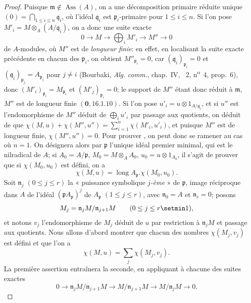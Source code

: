 \begin{proof}
Puisque $\mathfrak{m}\notin\operatorname{Ass}(A)$, on a une décomposition primaire réduite unique $(0)=\bigcap_{1\leq i\leq n}\mathfrak{q}_i$, où l'idéal $\mathfrak{q}_i$ est $\mathfrak{p}_i$-primaire pour $1\leq i\leq n$.
Si l'on pose $M'_i=M\otimes_A(A/\mathfrak{q}_i)$, on a donc une suite exacte
\[
  0\to M\to\bigoplus_iM'_i\to M''\to0
\]
de $A$-modules, où $M''$ est de \emph{longueur finie}:
en effet, en localisant la suite exacte précédente en chacun des $\mathfrak{p}_i$, on obtient $M''_{\mathfrak{p}_i}=0$, car $(\mathfrak{q}_i)_{\mathfrak{p}_i}=0$ et $(\mathfrak{q}_i)_{\mathfrak{p}_j}=A_{\mathfrak{p}_j}$ pour $j\neq i$ (Bourbaki, \emph{Alg. comm.}, chap.~IV, \textsection~2, n\textsuperscript{o}~4, prop.~6), donc $(M'_i)_{\mathfrak{p}_i}=M_{\mathfrak{p}_i}$ et $(M'_j)_{\mathfrak{p}_i}=0$;
le support de $M''$ étant donc réduit à $\mathfrak{m}$, $M''$ est de longueur finie $(\mathbf{0},16.1.10)$.
Si l'on pose $u'_i=u\otimes1_{A/\mathfrak{q}_i}$, et si $u''$ est l'endomorphisme de $M''$ déduit de $\bigoplus_i u'_i$ par passage aux quotients, on déduit de  que $\chi(M,u)+\chi(M'',u'')=\sum_{i=1}^n\chi(M'_i,u'_i)$, et puisque $M''$ est de longueur finie, $\chi(M'',u'')=0$.
Pour prouver , on peut donc se ramener au cas où $n=1$.
On désignera alors par $\mathfrak{p}$ l'unique idéal premier minimal, qui est le nilradical de $A$;
si $A_0=A/\mathfrak{p}$, $M_0=M\otimes_AA_0$, $u_0=u\otimes1_{A_0}$, il s'agit de prouver que si $\chi(M_0,u_0)$ est défini, on a
\[
\label{IV.21.10.17.9}
  \chi(M,u)=\operatorname{long}A_{\mathfrak{p}}.\chi(M_0,u_0).
  \tag{21.10.17.9}
\]
Soit $\mathfrak{n}_j$ $(0\leq j\leq r)$ la « puissance symbolique \emph{$j$-ème} » de $\mathfrak{p}$, image réciproque dans $A$ de l'idéal $(\mathfrak{p}A_{\mathfrak{p}})^j$ de $A_{\mathfrak{p}}$ $(1\leq j\leq r)$, avec $\mathfrak{n}_0=A$ et $\mathfrak{n}_r=0$;
posons
\[
  M_j=\mathfrak{n}_jM/\mathfrak{n}_{j+1}M\qquad(0\leq j\leq r\setmin 1),
\]
et notons $v_j$ l'endomorphisme de $M_j$ déduit de $u$ par restriction à $\mathfrak{n}_jM$ et passage aux quotients.
Nous allons d'abord montrer que chacun des nombres $\chi(M_j,v_j)$ est défini et que l'on a
\[
\label{IV.21.10.17.10}
  \chi(M,u)=\sum_j\chi(M_j,v_j).
  \tag{21.10.17.10}
\]
La première assertion entraînera la seconde, en appliquant  à chacune des suites exactes
\[
  0\to\mathfrak{n}_jM/\mathfrak{n}_{j+1}M\to M/\mathfrak{n}_{j+1}M\to M/\mathfrak{n}_jM\to0.
\]


\end{proof}
